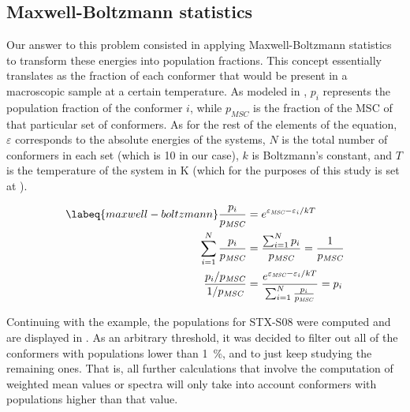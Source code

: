 \subsection{Maxwell-Boltzmann statistics}
Our answer to this problem consisted in applying Maxwell-Boltzmann statistics to transform these energies into population fractions.
This concept essentially translates as the fraction of each conformer that would be present in a macroscopic sample at a certain temperature.
As modeled in , $p_i$ represents the population fraction of the conformer $i$, while $p_\textit{MSC}$ is the fraction of the MSC of that particular set of conformers.
As for the rest of the elements of the equation, $\varepsilon$ corresponds to the absolute energies of the systems, $N$ is the total number of conformers in each set (which is 10 in our case), $k$ is Boltzmann's constant, and $T$ is the temperature of the system in \si{\kelvin} (which for the purposes of this study is set at ).

\begin{align}
\begin{split}
    \labeq{maxwell-boltzmann}
    \frac{p_i}{p_\textit{MSC}}&=e^{\varepsilon_\textit{MSC}-\varepsilon_i/kT} \\
    \sum_{i=1}^{N}\frac{p_i}{p_\textit{MSC}}&=\frac{\sum_{i=1}^{N}p_i}{p_\textit{MSC}}=\frac{1}{p_\textit{MSC}} \\
    \frac{p_i/p_\textit{MSC}}{1/p_\textit{MSC}}&=\frac{e^{\varepsilon_\textit{MSC}-\varepsilon_i/kT}}{\sum_{i=1}^{N}\frac{p_i}{p_\textit{MSC}}}=p_i \\
\end{split}
\end{align}

Continuing with the example, the populations for STX-S08 were computed and are displayed in .
As an arbitrary threshold, it was decided to filter out all of the conformers with populations lower than \SI{1}{\percent}, and to just keep studying the remaining ones.
That is, all further calculations that involve the computation of weighted mean values or spectra will only take into account conformers with populations higher than that value.

